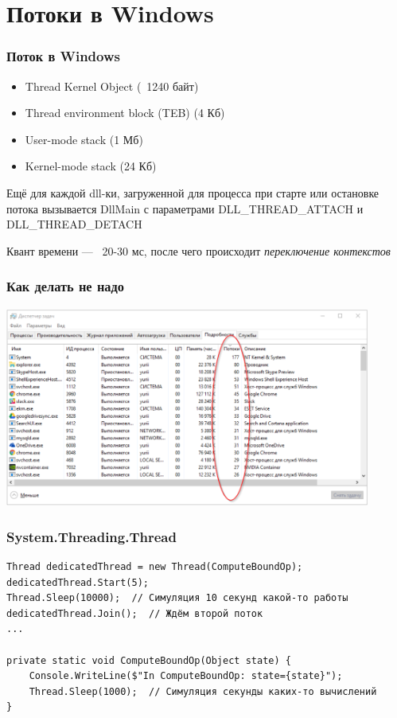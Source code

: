 \documentclass[xetex,mathserif,serif]{beamer}
\begin{document}
	\section{Потоки в Windows}

	\begin{frame}
		\frametitle{Поток в Windows}
		\begin{itemize}
			\item Thread Kernel Object (~1240 байт)
			\item Thread environment block (TEB) (4 Кб)
			\item User-mode stack (1 Мб)
			\item Kernel-mode stack (24 Кб)			
		\end{itemize}

		Ещё для каждой dll-ки, загруженной для процесса при старте или остановке потока вызывается DllMain с параметрами DLL\_THREAD\_ATTACH и DLL\_THREAD\_DETACH

		\vspace{3mm}
		Квант времени --- ~20-30 мс, после чего происходит \textit{переключение контекстов}
	\end{frame}

	\begin{frame}
		\frametitle{Как делать не надо}
		\begin{center}
			\includegraphics[width=0.9\textwidth]{threadsEverywhere.png}
		\end{center}
	\end{frame}

	\begin{frame}[fragile]
		\frametitle{System.Threading.Thread}
		\begin{verbatim}
Thread dedicatedThread = new Thread(ComputeBoundOp);
dedicatedThread.Start(5);
Thread.Sleep(10000);  // Симуляция 10 секунд какой-то работы
dedicatedThread.Join();  // Ждём второй поток
...

private static void ComputeBoundOp(Object state) {
    Console.WriteLine($"In ComputeBoundOp: state={state}");
    Thread.Sleep(1000);  // Симуляция секунды каких-то вычислений
}
		\end{verbatim}
	\end{frame}
\end{document}
